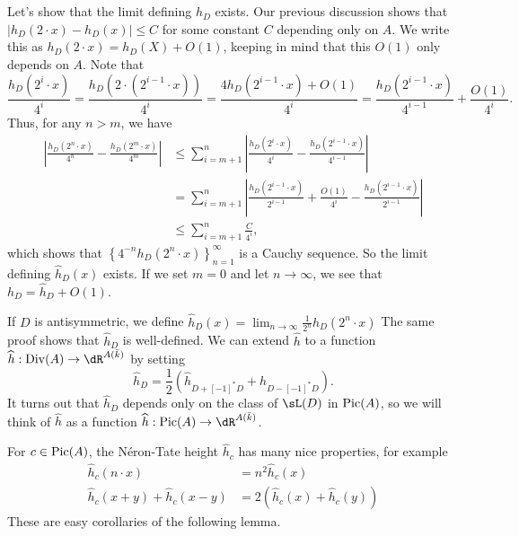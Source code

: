 Let's show that the limit defining $\widehat h_D$ exists. Our previous 
discussion shows that $|h_D(2\cdot x)-h_D(x)|\leqslant C$ for some constant $C$ 
depending only on $A$. We write this as $h_D(2\cdot x)=h_D(X)+O(1)$, keeping in 
mind that this $O(1)$ only depends on $A$. Note that 
\[
  \frac{h_D(2^i\cdot x)}{4^i} = \frac{h_D(2\cdot (2^{i-1}\cdot x))}{4^i} = \frac{4 h_D(2^{i-1}\cdot x)+O(1)}{4^i} = \frac{h_D(2^{i-1}\cdot x)}{4^{i-1}} + \frac{O(1)}{4^i} \text{.}
\]
Thus, for any $n>m$, we have 
\begin{align*}
  \left| \frac{h_D(2^n \cdot x)}{4^n} - \frac{h_D(2^m\cdot x)}{4^m}\right|
    &\leqslant \sum_{i=m+1}^n \left|\frac{h_D(2^i\cdot x)}{4^i} - \frac{h_D(2^{i-1}\cdot x)}{4^{i-1}}\right| \\
    &= \sum_{i=m+1}^n \left|\frac{h_D(2^{i-1}\cdot x)}{2^{i-1}} +\frac{O(1)}{4^i} - \frac{h_D(2^{i-1}\cdot x)}{2^{i-1}}\right| \\
    &\leqslant \sum_{i=m+1}^n \frac{C}{4^i} \text{,}
\end{align*}
which shows that $\left\{4^{-n} h_D(2^n\cdot x)\right\}_{n=1}^\infty$ is a Cauchy 
sequence. So the limit defining $\widehat h_D(x)$ exists. If we set $m=0$ and 
let $n\to \infty$, we see that $h_D=\widehat h_D+O(1)$. 

If $D$ is antisymmetric, we define 
$\widehat h_D(x)=\lim_{n\to\infty} \frac{1}{2^n} h_D(2^n\cdot x)$
The same proof shows that $\widehat h_D$ is well-defined. We can extend 
$\widehat h$ to a function $\widehat h:\divisor(A)\to \dR^{A(\bar k)}$ by setting 
\[
  \widehat h_D=\frac 1 2 \left(\widehat h_{D+[-1]^\ast D} +  h_{D-[-1]^\ast D}\right) \text{.}
\]
It turns out that $\widehat h_D$ depends only on the class of $\sL(D)$ in 
$\operatorname{Pic}(A)$, so we will think of $\widehat h$ as a function 
$\widehat h:\picard(A) \to \dR^{A(\bar k)}$. 

For $c\in \operatorname{Pic}(A)$, the N\'eron-Tate height $\widehat h_c$ has many nice 
properties, for example 
\begin{align*}
  \widehat h_c(n\cdot x) &= n^2 \widehat h_c(x) \\
  \widehat h_c(x+y)+\widehat h_c(x-y) &= 2\left(\widehat h_c(x)+\widehat h_c(y)\right)
\end{align*}
These are easy corollaries of the following lemma.

